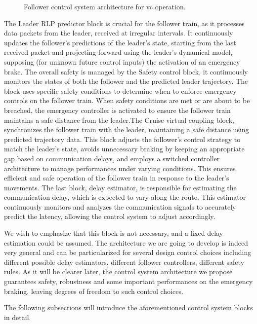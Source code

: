 \documentclass[letterpaper, 10 pt, conference]{ieeeconf}
\theoremstyle{definition}
\theoremstyle{nopoint}
\begin{document}
 
 \begin{figure}[H]
 	\resizebox{\linewidth}{!}{}
 	\caption{Follower control system architecture for \gls{vc} operation. }
 	\label{fig:controlSystem}
 \end{figure}
 
The Leader RLP predictor block is crucial for the follower train, as it processes data packets from the leader, received at irregular intervals. It continuously updates the follower's predictions of the leader's state, starting from the last received packet and projecting forward using the leader’s dynamical model, supposing (for unknown future control inputs) the activation of an emergency brake. The overall safety is managed by the Safety control block, it continuously monitors the states of both the follower and the predicted leader trajectory. The block uses specific safety conditions to determine when to enforce emergency controls on the follower train. When safety conditions are met or are about to be breached, the emergency controller is activated to ensure the follower train maintains a safe distance from the leader.The Cruise virtual coupling block, synchronizes the follower train with the leader, maintaining a safe distance using predicted trajectory data. This block adjusts the follower's control strategy to match the leader's state, avoids unnecessary braking by keeping an appropriate gap based on communication delays, and employs a switched controller architecture to manage performances under varying conditions. This ensures efficient and safe operation of the follower train in response to the leader's movements.  The last block, delay estimator, is responsible for estimating the communication delay, which is expected to vary along the route. This estimator continuously monitors and analyzes the communication signals to accurately predict the latency, allowing the control system to adjust accordingly.

We wish to emphasize that this block is not necessary, and a fixed delay estimation could be assumed. The architecture we are going to develop is indeed very general and can be particularized for several design control choices including different possible delay estimators, different follower controllers, different safety rules. As it will be clearer later, the control system architecture we propose guarantees safety, robustness and some important performances on the emergency braking, leaving degrees of freedom to such control choices.
 
The following subsections will introduce the aforementioned control system blocks in detail. 
\end{document}
